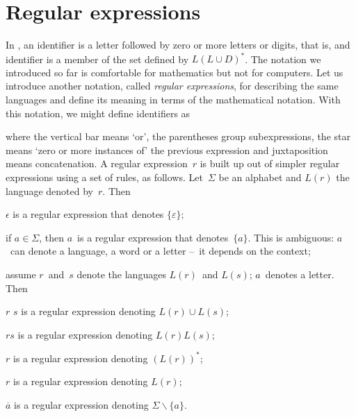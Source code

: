 \section{Regular expressions}

In \Pascal, an identifier is a letter followed by zero or more letters
or digits, that is, and identifier is a member of the set defined by
\(L(L \cup D)^{*}\). The notation we introduced so far is comfortable
for mathematics but not for computers. Let us introduce another
notation, called \emph{regular expressions}, for describing the same
languages and define its meaning in terms of the mathematical
notation. With this notation, we might define \Pascal identifiers as
\begin{center}
 \lparen{} \disj {}\rparen\kleene
\end{center}
where the vertical bar means `or', the parentheses group
subexpressions, the star means `zero or more instances of' the
previous expression and juxtaposition means concatenation. A regular
expression~\(r\) is built up out of simpler regular expressions using
a set of rules, as follows. Let~\(\Sigma\) be an alphabet and \(L(r)\)
the language denoted by~\(r\). Then
\begin{enumerate*}

   \item \(\epsilon\) is a regular expression that denotes
     \(\{\varepsilon\}\);\label{regexp_empty}

   \item if \(a \in \Sigma\), then \(a\)~is a regular expression that
     denotes~\(\{a\}\). This is ambiguous: \(a\)~can denote a
     language, a word or a letter --~it depends on the
     context; \label{regexp_sym}

   \item assume \(r\)~and~\(s\) denote the languages \(L(r)\)~and
     \(L(s)\); \(a\)~denotes a letter. Then \label{regexp_rec}
   \begin{enumerate*}
    
     \item \(r\) \disj \(s\) is a regular expression
     denoting \(L(r) \cup L(s)\);

     \item \(r s\) is a regular expression denoting \(L(r) L(s)\);

     \item \(r\)\kleene{} is a regular expression
     denoting \((L(r))^{*}\);

     \item \lparen\(r\)\rparen{} is a regular expression
     denoting \(L(r)\);

     \item \(\overline{a}\) is a regular expression denoting
       \(\Sigma\backslash \{a\}\).

   \end{enumerate*}

\end{enumerate*}
